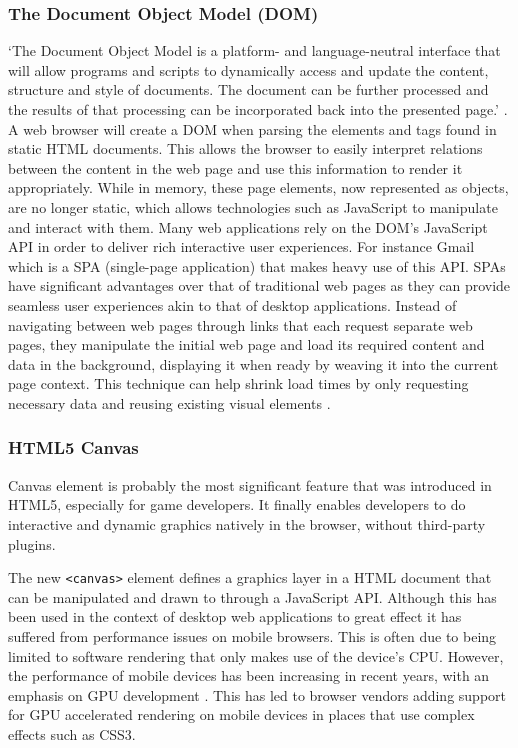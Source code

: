\documentclass[final]{cmpreport}
\begin{document}
\subsubsection{The Document Object Model (DOM)}
`The Document Object Model is a platform- and language-neutral interface that will allow programs and scripts to dynamically access and update the content, structure and style of documents. The document can be further processed and the results of that processing can be incorporated back into the presented page.' \citep{W3C3}. A web browser will create a DOM when parsing the elements and tags found in static HTML documents. This allows the browser to easily interpret relations between the content in the web page and use this information to render it appropriately. While in memory, these page elements, now represented as objects, are no longer static, which allows technologies such as JavaScript to manipulate and interact with them. Many web applications rely on the DOM's JavaScript API in order to deliver rich interactive user experiences. For instance Gmail which is a SPA (single-page application) that makes heavy use of this API. SPAs have significant advantages over that of traditional web pages as they can provide seamless user experiences akin to that of desktop applications. Instead of navigating between web pages through links that each request separate web pages, they manipulate the initial web page and load its required content and data in the background, displaying it when ready by weaving it into the current page context. This technique can help shrink load times by only requesting necessary data and reusing existing visual elements \citep{Takada}.

\subsubsection{HTML5 Canvas}
Canvas element is probably the most significant feature that was introduced in HTML5, especially for game developers. It finally enables developers to do interactive and dynamic graphics natively in the browser, without third-party plugins.

The new \texttt{<canvas>} element defines a graphics layer in a HTML document that can be manipulated and drawn to through a JavaScript API. Although this has been used in the context of desktop web applications to great effect it has suffered from performance issues on mobile browsers. This is often due to being limited to software rendering that only makes use of the device's CPU. However, the performance of mobile devices has been increasing in recent years, with an emphasis on GPU development \cite{Lin}. This has led to browser vendors adding support for GPU accelerated rendering on mobile devices in places that use complex effects such as CSS3.
\end{document}
